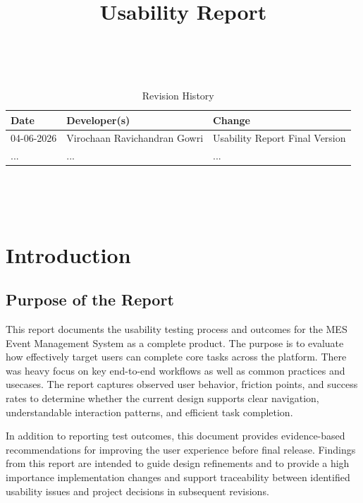\documentclass[12pt]{article}
\title{Usability Report\\\progname}
\author{\authname}
\date{}
\begin{document}
\maketitle
\thispagestyle{empty}

~\newpage


\begin{table}[hp]
\caption{Revision History} \label{TblRevisionHistory}
\begin{tabularx}{\textwidth}{llX}
\toprule
\textbf{Date} & \textbf{Developer(s)} & \textbf{Change}\\
\midrule
04-06-2026 & Virochaan Ravichandran Gowri & Usability Report Final Version\\

... & ... & ...\\
\bottomrule
\end{tabularx}
\end{table}

~\newpage

\tableofcontents

~\newpage

\section{Introduction}
\subsection{Purpose of the Report}
This report documents the usability testing process and outcomes for the MES Event Management System as a complete product. The purpose is to evaluate how effectively target users can complete core tasks across the platform. There was heavy focus on key end-to-end workflows as well as common practices and usecases. The report captures observed user behavior, friction points, and success rates to determine whether the current design supports clear navigation, understandable interaction patterns, and efficient task completion.

In addition to reporting test outcomes, this document provides evidence-based recommendations for improving the user experience before final release. Findings from this report are intended to guide design refinements and to provide a high importance implementation changes and support traceability between identified usability issues and project decisions in subsequent revisions.
\end{document}
